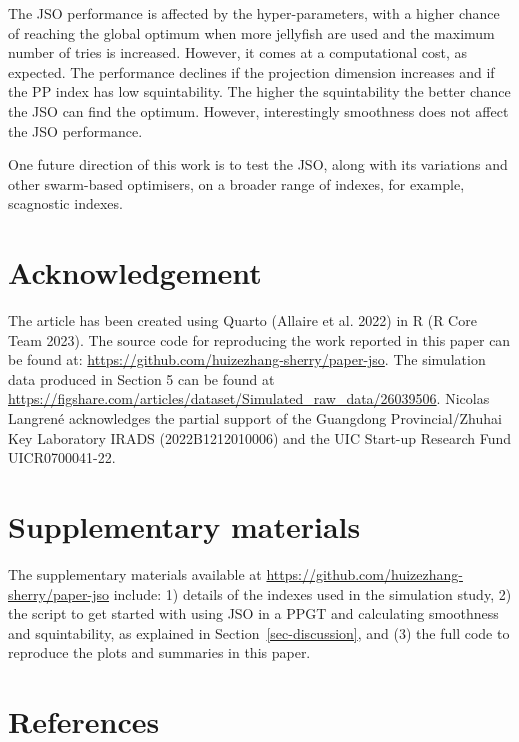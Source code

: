 \documentclass[
  12pt,
]{interact}
\theoremstyle{plain}
\begin{document}
The JSO performance is affected by the hyper-parameters, with a higher
chance of reaching the global optimum when more jellyfish are used and
the maximum number of tries is increased. However, it comes at a
computational cost, as expected. The performance declines if the
projection dimension increases and if the PP index has low
squintability. The higher the squintability the better chance the JSO
can find the optimum. However, interestingly smoothness does not affect
the JSO performance.

One future direction of this work is to test the JSO, along with its
variations and other swarm-based optimisers, on a broader range of
indexes, for example, scagnostic indexes.

\hypertarget{acknowledgement}{%
\section{Acknowledgement}\label{acknowledgement}}

The article has been created using Quarto (Allaire et al. 2022) in R (R
Core Team 2023). The source code for reproducing the work reported in
this paper can be found at:
\url{https://github.com/huizezhang-sherry/paper-jso}. The simulation
data produced in Section 5 can be found at
\url{https://figshare.com/articles/dataset/Simulated_raw_data/26039506}.
Nicolas Langrené acknowledges the partial support of the Guangdong
Provincial/Zhuhai Key Laboratory IRADS (2022B1212010006) and the UIC
Start-up Research Fund UICR0700041-22.

\hypertarget{supplementary-materials}{%
\section*{Supplementary materials}\label{supplementary-materials}}

The supplementary materials available at
\url{https://github.com/huizezhang-sherry/paper-jso} include: 1) details
of the indexes used in the simulation study, 2) the script to get
started with using JSO in a PPGT and calculating smoothness and
squintability, as explained in Section~\ref{sec-discussion}, and (3) the
full code to reproduce the plots and summaries in this paper.

\hypertarget{references}{%
\section*{References}\label{references}}
\end{document}
